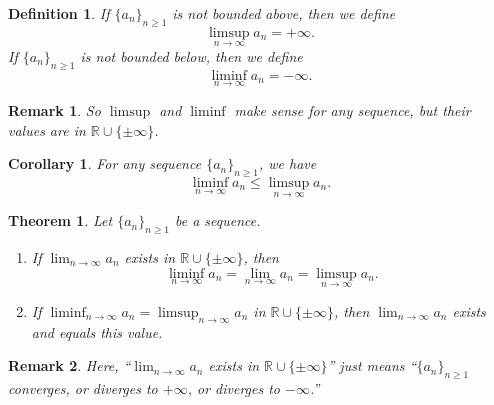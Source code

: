 \documentclass[12pt]{article}
\newtheorem*{remark}{Remark}
\newtheorem{theorem}{Theorem}
\newtheorem{corollary}{Corollary}
\newtheorem{definition}{Definition}
\begin{document}
\begin{definition}
If $\{a_n\}_{n\ge 1}$ is not bounded above, then we define
\[
\limsup_{n\to\infty} a_n=+\infty.
\]
If $\{a_n\}_{n\ge 1}$ is not bounded below, then we define
\[
\liminf_{n\to\infty} a_n=-\infty.
\]
\end{definition}

\begin{remark}
So $\limsup$ and $\liminf$ make sense for any sequence, but their values are in
$\mathbb{R}\cup\{\pm\infty\}$.
\end{remark}

\begin{corollary}
For any sequence $\{a_n\}_{n\ge 1}$, we have
\[
\liminf_{n\to\infty} a_n \le \limsup_{n\to\infty} a_n.
\]
\end{corollary}

\begin{theorem}
Let $\{a_n\}_{n\ge 1}$ be a sequence.
\begin{enumerate}[label=\textbf{(\arabic*)}]
\item If $\lim_{n\to\infty} a_n$ exists in $\mathbb{R}\cup\{\pm\infty\}$, then
\[
\liminf_{n\to\infty} a_n=\lim_{n\to\infty} a_n=\limsup_{n\to\infty} a_n.
\]
\item If $\liminf_{n\to\infty} a_n=\limsup_{n\to\infty} a_n$ in
$\mathbb{R}\cup\{\pm\infty\}$, then $\lim_{n\to\infty} a_n$ exists and equals
this value.
\end{enumerate}
\end{theorem}

\begin{remark}
Here, ``$\lim_{n\to\infty} a_n$ exists in $\mathbb{R}\cup\{\pm\infty\}$'' just
means ``$\{a_n\}_{n\ge 1}$ converges, or diverges to $+\infty$, or diverges to
$-\infty$.''
\end{remark}
\end{document}
